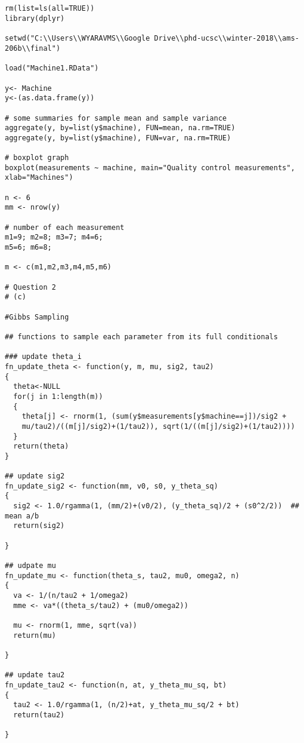 \documentclass[a4paper, 11pt]{article}
\begin{document}
\begin{verbatim}


rm(list=ls(all=TRUE))
library(dplyr)

setwd("C:\\Users\\WYARAVMS\\Google Drive\\phd-ucsc\\winter-2018\\ams-206b\\final")

load("Machine1.RData")

y<- Machine
y<-(as.data.frame(y))

# some summaries for sample mean and sample variance
aggregate(y, by=list(y$machine), FUN=mean, na.rm=TRUE)
aggregate(y, by=list(y$machine), FUN=var, na.rm=TRUE)

# boxplot graph
boxplot(measurements ~ machine, main="Quality control measurements", xlab="Machines")

n <- 6
mm <- nrow(y)

# number of each measurement
m1=9; m2=8; m3=7; m4=6;
m5=6; m6=8;

m <- c(m1,m2,m3,m4,m5,m6)

# Question 2
# (c)

#Gibbs Sampling

## functions to sample each parameter from its full conditionals

### update theta_i
fn_update_theta <- function(y, m, mu, sig2, tau2)
{
  theta<-NULL
  for(j in 1:length(m))
  {
    theta[j] <- rnorm(1, (sum(y$measurements[y$machine==j])/sig2 +
    mu/tau2)/((m[j]/sig2)+(1/tau2)), sqrt(1/((m[j]/sig2)+(1/tau2))))
  }
  return(theta)
}

## update sig2
fn_update_sig2 <- function(mm, v0, s0, y_theta_sq)
{
  sig2 <- 1.0/rgamma(1, (mm/2)+(v0/2), (y_theta_sq)/2 + (s0^2/2))  ## mean a/b
  return(sig2)
  
}

## udpate mu
fn_update_mu <- function(theta_s, tau2, mu0, omega2, n)
{
  va <- 1/(n/tau2 + 1/omega2)
  mme <- va*((theta_s/tau2) + (mu0/omega2))
  
  mu <- rnorm(1, mme, sqrt(va))
  return(mu)
  
}

## update tau2
fn_update_tau2 <- function(n, at, y_theta_mu_sq, bt)
{
  tau2 <- 1.0/rgamma(1, (n/2)+at, y_theta_mu_sq/2 + bt)
  return(tau2)
  
}


\end{verbatim}
\end{document}
